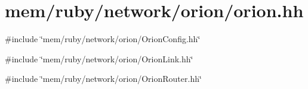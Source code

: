 \hypertarget{orion_8hh}{
\section{mem/ruby/network/orion/orion.hh}
\label{orion_8hh}
}
{\ttfamily \#include \char`\"{}mem/ruby/network/orion/OrionConfig.hh\char`\"{}}\par
{\ttfamily \#include \char`\"{}mem/ruby/network/orion/OrionLink.hh\char`\"{}}\par
{\ttfamily \#include \char`\"{}mem/ruby/network/orion/OrionRouter.hh\char`\"{}}\par
